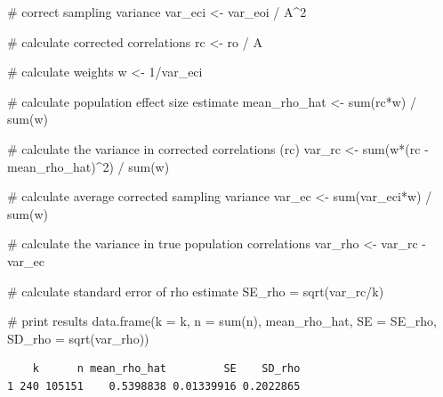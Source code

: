 \documentclass[
  letterpaper,
  DIV=11,
  numbers=noendperiod]{scrreprt}
\newenvironment{Shaded}{}{}
\newcommand{\AttributeTok}[1]{\textcolor[rgb]{0.00,0.34,0.68}{#1}}
\newcommand{\CommentTok}[1]{\textcolor[rgb]{0.54,0.53,0.53}{#1}}
\newcommand{\DecValTok}[1]{\textcolor[rgb]{0.69,0.50,0.00}{#1}}
\newcommand{\FunctionTok}[1]{\textcolor[rgb]{0.39,0.29,0.61}{#1}}
\newcommand{\NormalTok}[1]{\textcolor[rgb]{0.12,0.11,0.11}{#1}}
\newcommand{\OtherTok}[1]{\textcolor[rgb]{0.00,0.43,0.16}{#1}}
\newcommand{\SpecialCharTok}[1]{\textcolor[rgb]{0.24,0.68,0.91}{#1}}
\begin{document}
\begin{Shaded}
\begin{Highlighting}[]
\CommentTok{\# correct sampling variance}
\NormalTok{var\_eci }\OtherTok{\textless{}{-}}\NormalTok{ var\_eoi }\SpecialCharTok{/}\NormalTok{ A}\SpecialCharTok{\^{}}\DecValTok{2}

\CommentTok{\# calculate corrected correlations}
\NormalTok{rc }\OtherTok{\textless{}{-}}\NormalTok{ ro }\SpecialCharTok{/}\NormalTok{ A}

\CommentTok{\# calculate weights}
\NormalTok{w }\OtherTok{\textless{}{-}} \DecValTok{1}\SpecialCharTok{/}\NormalTok{var\_eci}

\CommentTok{\# calculate population effect size estimate}
\NormalTok{mean\_rho\_hat }\OtherTok{\textless{}{-}} \FunctionTok{sum}\NormalTok{(rc}\SpecialCharTok{*}\NormalTok{w) }\SpecialCharTok{/} \FunctionTok{sum}\NormalTok{(w)}

\CommentTok{\# calculate the variance in corrected correlations (rc)}
\NormalTok{var\_rc }\OtherTok{\textless{}{-}} \FunctionTok{sum}\NormalTok{(w}\SpecialCharTok{*}\NormalTok{(rc }\SpecialCharTok{{-}}\NormalTok{ mean\_rho\_hat)}\SpecialCharTok{\^{}}\DecValTok{2}\NormalTok{) }\SpecialCharTok{/} \FunctionTok{sum}\NormalTok{(w)}

\CommentTok{\# calculate average corrected sampling variance}
\NormalTok{var\_ec }\OtherTok{\textless{}{-}} \FunctionTok{sum}\NormalTok{(var\_eci}\SpecialCharTok{*}\NormalTok{w) }\SpecialCharTok{/} \FunctionTok{sum}\NormalTok{(w)}

\CommentTok{\# calculate the variance in true population correlations}
\NormalTok{var\_rho }\OtherTok{\textless{}{-}}\NormalTok{ var\_rc }\SpecialCharTok{{-}}\NormalTok{ var\_ec}

\CommentTok{\# calculate standard error of rho estimate}
\NormalTok{SE\_rho }\OtherTok{=} \FunctionTok{sqrt}\NormalTok{(var\_rc}\SpecialCharTok{/}\NormalTok{k)}

\CommentTok{\# print results}
\FunctionTok{data.frame}\NormalTok{(}\AttributeTok{k =}\NormalTok{ k,}
           \AttributeTok{n =} \FunctionTok{sum}\NormalTok{(n),}
\NormalTok{           mean\_rho\_hat,}
           \AttributeTok{SE =}\NormalTok{ SE\_rho,}
           \AttributeTok{SD\_rho =} \FunctionTok{sqrt}\NormalTok{(var\_rho))}
\end{Highlighting}
\end{Shaded}

\begin{verbatim}
    k      n mean_rho_hat         SE    SD_rho
1 240 105151    0.5398838 0.01339916 0.2022865
\end{verbatim}
\end{document}
